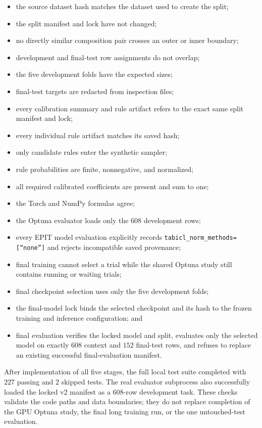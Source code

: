 \documentclass{article}
\begin{document}
\begin{itemize}
    \item the source dataset hash matches the dataset used to create the split;
    \item the split manifest and lock have not changed;
    \item no directly similar composition pair crosses an outer or inner
    boundary;
    \item development and final-test row assignments do not overlap;
    \item the five development folds have the expected sizes;
    \item final-test targets are redacted from inspection files;
    \item every calibration summary and rule artifact refers to the exact same
    split manifest and lock;
    \item every individual rule artifact matches its saved hash;
    \item only candidate rules enter the synthetic sampler;
    \item rule probabilities are finite, nonnegative, and normalized;
    \item all required calibrated coefficients are present and sum to one;
    \item the Torch and NumPy formulas agree;
    \item the Optuna evaluator loads only the \(608\) development rows;
    \item every EPIT model evaluation explicitly records
    \texttt{tabicl\_norm\_methods=[``none'']} and rejects incompatible saved
    provenance;
    \item final training cannot select a trial while the shared Optuna study
    still contains running or waiting trials;
    \item final checkpoint selection uses only the five development folds;
    \item the final-model lock binds the selected checkpoint and its hash to
    the frozen training and inference configuration; and
    \item final evaluation verifies the locked model and split, evaluates only
    the selected model on exactly \(608\) context and \(152\) final-test rows,
    and refuses to replace an existing successful final-evaluation manifest.
\end{itemize}

After implementation of all five stages, the full local test suite completed
with \(227\) passing and \(2\) skipped tests. The real evaluator subprocess
also successfully loaded the locked v2 manifest as a \(608\)-row development
task. These checks validate the code paths and data boundaries; they do not
replace completion of the GPU Optuna study, the final long training run, or
the one untouched-test evaluation.
\end{document}
